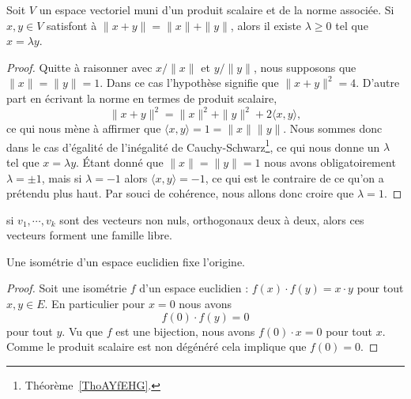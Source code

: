 \begin{lemma}   \label{LemLPOHUme}
    Soit \( V\) un espace vectoriel muni d'un produit scalaire et de la norme associée. Si \( x,y\in V\) satisfont à \( \| x+y \|=\| x \|+\| y \|\), alors il existe \( \lambda\geq 0\) tel que \( x=\lambda y\).
\end{lemma}

\begin{proof}
    Quitte à raisonner avec \( x/\| x \|\) et \( y/\| y \|\), nous supposons que \( \| x \|=\| y \|=1\). Dans ce cas l'hypothèse signifie que \( \| x+y \|^2=4\). D'autre part en écrivant la norme en termes de produit scalaire,
    \begin{equation}
        \| x+y \|^2=\| x \|^2+\| y \|^2+2\langle x, y\rangle ,
    \end{equation}
    ce qui nous mène à affirmer que \( \langle x, y\rangle =1=\| x \|\| y \|\). Nous sommes donc dans le cas d'égalité de l'inégalité de Cauchy-Schwarz\footnote{Théorème~\ref{ThoAYfEHG}.}, ce qui nous donne un \( \lambda\) tel que \( x=\lambda y\). Étant donné que \( \| x \|=\| y \|=1\) nous avons obligatoirement \( \lambda=\pm 1\), mais si \( \lambda=-1\) alors \( \langle x, y\rangle =-1\), ce qui est le contraire de ce qu'on a prétendu plus haut. Par souci de cohérence, nous allons donc croire que \( \lambda=1\).
\end{proof}

\begin{proposition}			\label{PropVectsOrthLibres}
	si $v_1,\cdots,v_k$ sont des vecteurs non nuls, orthogonaux deux à deux, alors ces vecteurs forment une famille libre.
\end{proposition}

\begin{lemma}       \label{LEMooYXJZooWKRFRu}
    Une isométrie d'un espace euclidien fixe l'origine.
\end{lemma}

\begin{proof}
    Soit une isométrie \( f\) d'un espace euclidien : \( f(x)\cdot f(y)=x\cdot y\) pour tout \( x,y\in E\). En particulier pour \( x=0\) nous avons
    \begin{equation}
        f(0)\cdot f(y)=0
    \end{equation}
    pour tout \( y\). Vu que \( f\) est une bijection, nous avons \( f(0)\cdot x=0\) pour tout \( x\). Comme le produit scalaire est non dégénéré cela implique que \( f(0)=0\).
\end{proof}

